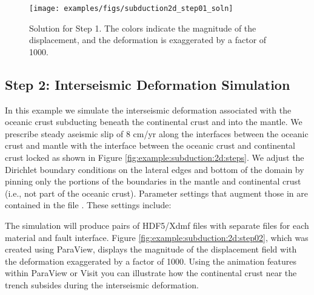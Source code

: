 \begin{figure}
  \texttt{[image: examples/figs/subduction2d\_step01\_soln]}
  \caption{Solution for Step 1. The colors indicate the magnitude of the displacement,
    and the deformation is exaggerated by a factor of 1000. }
  \label{fig:example:subduction:2d:step01}
\end{figure}


\subsection{Step 2: Interseismic Deformation Simulation}

In this example we simulate the interseismic deformation associated
with the oceanic crust subducting beneath the continental crust and
into the mantle. We prescribe steady aseismic slip of 8 cm/yr along
the interfaces between the oceanic crust and mantle with the interface
between the oceanic crust and continental crust locked as shown in
Figure \vref{fig:example:subduction:2d:steps}. We adjust the Dirichlet
boundary conditions on the lateral edges and bottom of the domain
by pinning only the portions of the boundaries in the mantle and continental
crust (i.e., not part of the oceanic crust). Parameter settings that
augment those in  are contained in the file
. These settings include:
\begin{inventory}
\end{inventory}

The simulation will produce pairs of HDF5/Xdmf files with separate
files for each material and fault interface. Figure
\vref{fig:example:subduction:2d:step02}, which was created using
ParaView, displays the magnitude of the displacement field with the
deformation exaggerated by a factor of 1000. Using the animation
features within ParaView or Visit you can illustrate how the
continental crust near the trench subsides during the interseismic
deformation.

